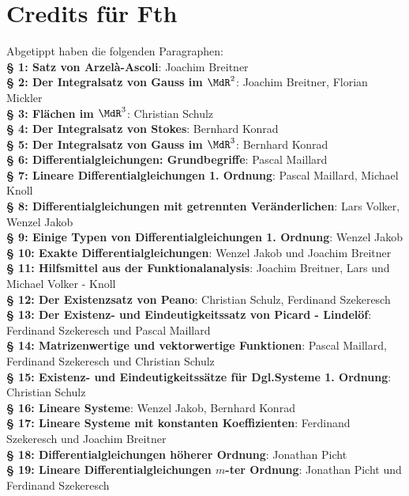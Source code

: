 \chapter{Credits für Fth} Abgetippt haben die folgenden Paragraphen:\\
\textbf{§ 1: Satz von Arzelà-Ascoli}: Joachim Breitner\\
\textbf{§ 2: Der Integralsatz von Gauss im $\MdR^2$}: Joachim Breitner, Florian Mickler\\
\textbf{§ 3: Flächen im $\MdR^3$}: Christian Schulz\\
\textbf{§ 4: Der Integralsatz von Stokes}: Bernhard Konrad\\
\textbf{§ 5: Der Integralsatz von Gauss im $\MdR^3$}: Bernhard Konrad\\
\textbf{§ 6: Differentialgleichungen: Grundbegriffe}: Pascal Maillard\\
\textbf{§ 7: Lineare Differentialgleichungen 1. Ordnung}: Pascal Maillard, Michael Knoll\\
\textbf{§ 8: Differentialgleichungen mit getrennten Veränderlichen}: Lars Volker, Wenzel Jakob\\
\textbf{§ 9: Einige Typen von Differentialgleichungen 1. Ordnung}: Wenzel Jakob\\
\textbf{§ 10: Exakte Differentialgleichungen}: Wenzel Jakob und Joachim Breitner\\
\textbf{§ 11: Hilfsmittel aus der Funktionalanalysis}: Joachim Breitner, Lars und Michael Volker - Knoll\\
\textbf{§ 12: Der Existenzsatz von Peano}: Christian Schulz, Ferdinand Szekeresch\\
\textbf{§ 13: Der Existenz- und Eindeutigkeitssatz von Picard - Lindelöf}: Ferdinand Szekeresch und Pascal Maillard\\
\textbf{§ 14: Matrizenwertige und vektorwertige Funktionen}: Pascal Maillard, Ferdinand Szekeresch und Christian Schulz\\
\textbf{§ 15: Existenz- und Eindeutigkeitssätze für Dgl.Systeme 1. Ordnung}: Christian Schulz\\
\textbf{§ 16: Lineare Systeme}: Wenzel Jakob, Bernhard Konrad\\
\textbf{§ 17: Lineare Systeme mit konstanten Koeffizienten}: Ferdinand Szekeresch und Joachim Breitner\\
\textbf{§ 18: Differentialgleichungen höherer Ordnung}: Jonathan Picht\\
\textbf{§ 19: Lineare Differentialgleichungen $m$-ter Ordnung}: Jonathan Picht und Ferdinand Szekeresch\\
